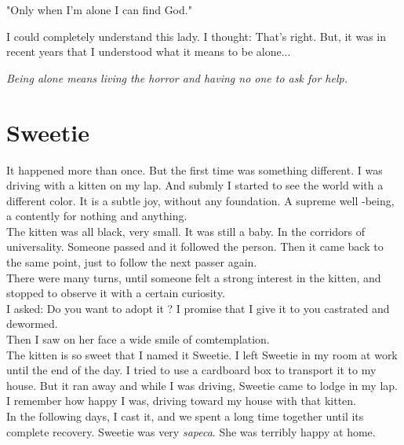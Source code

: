 \documentclass[11pt]{book}
\begin{document}
\noindent \begin{center} "Only when I'm alone I can find God." \end{center}

\noindent I could completely understand this lady. I thought: That's right. But, it was in recent years that I understood what it means to be alone...

\noindent \begin{center} \emph{Being alone means living the horror and having no one to ask for help.} \end{center}

\chapter{Sweetie}

\noindent It happened more than once. But the first time was something different. I was driving with a kitten on my lap. And submly I started to see the world with a different color. It is a subtle joy, without any foundation. A supreme well -being, a contently for nothing and anything. \\

\noindent The kitten was all black, very small. It was still a baby. In the corridors of universality. Someone passed and it followed the person. Then it came back to the same point, just to follow the next passer again. \\

\noindent There were many turns, until someone felt a strong interest in the kitten, and stopped to observe it with a certain curiosity. \\

\noindent I asked: Do you want to adopt it ? I promise that I give it to you castrated and dewormed. \\

\noindent Then I saw on her face a wide smile of comtemplation. \\

\noindent The kitten is so sweet that I named it Sweetie. I left Sweetie in my room at work until the end of the day. I tried to use a cardboard box to transport it to my house. But it ran away and while I was driving, Sweetie came to lodge in my lap. \\

\noindent I remember how happy I was, driving toward my house with that kitten. \\

\noindent In the following days, I cast it, and we spent a long time together until its complete recovery. Sweetie was very \emph {sapeca}. She was terribly happy at home. \\
\end{document}

